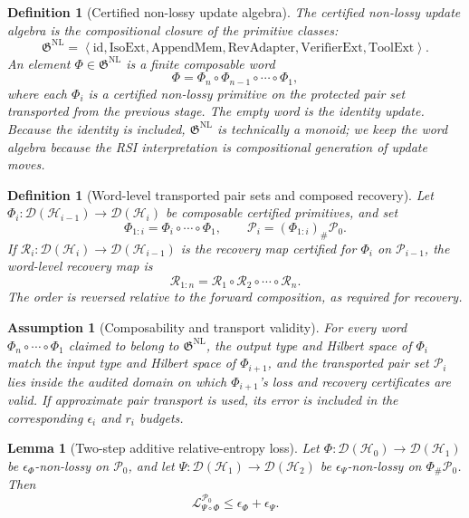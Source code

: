 \documentclass[11pt]{article}
\newtheorem{lemma}[theorem]{Lemma}
\newtheorem{definition}[theorem]{Definition}
\newtheorem{assumption}[theorem]{Assumption}
\newcommand{\D}{\mathcal{D}}
\newcommand{\Hcal}{\mathcal{H}}
\newcommand{\Pcal}{\mathcal{P}}
\newcommand{\Rcal}{\mathcal{R}}
\newcommand{\Lcal}{\mathcal{L}}
\newcommand{\1}{\mathbf{1}}
\begin{document}
\begin{definition}[Certified non-lossy update algebra]
\label{def:certified_nl_update_algebra}
The certified non-lossy update algebra is the compositional closure of the primitive classes:
\[
\boxed{
\mathfrak G^{\mathrm{NL}}
=
\left\langle
\mathrm{id},\mathrm{IsoExt},\mathrm{AppendMem},\mathrm{RevAdapter},\mathrm{VerifierExt},\mathrm{ToolExt}
\right\rangle.
}
\]
An element \(\Phi\in\mathfrak G^{\mathrm{NL}}\) is a finite composable word
\[
\Phi=\Phi_n\circ\Phi_{n-1}\circ\cdots\circ\Phi_1,
\]
where each \(\Phi_i\) is a certified non-lossy primitive on the protected pair set transported from the previous stage.  The empty word is the identity update.  Because the identity is included, \(\mathfrak G^{\mathrm{NL}}\) is technically a monoid; we keep the word algebra because the RSI interpretation is compositional generation of update moves.
\end{definition}

\begin{definition}[Word-level transported pair sets and composed recovery]
\label{def:word_pair_sets_recovery}
Let \(\Phi_i:\D(\Hcal_{i-1})\to\D(\Hcal_i)\) be composable certified primitives, and set
\[
\Phi_{1:i}=\Phi_i\circ\cdots\circ\Phi_1,
\qquad
\Pcal_i=(\Phi_{1:i})_\#\Pcal_0.
\]
If \(\Rcal_i:\D(\Hcal_i)\to\D(\Hcal_{i-1})\) is the recovery map certified for \(\Phi_i\) on \(\Pcal_{i-1}\), the word-level recovery map is
\[
\Rcal_{1:n}=\Rcal_1\circ\Rcal_2\circ\cdots\circ\Rcal_n.
\]
The order is reversed relative to the forward composition, as required for recovery.
\end{definition}

\begin{assumption}[Composability and transport validity]
\label{ass:composability_transport_validity}
For every word \(\Phi_n\circ\cdots\circ\Phi_1\) claimed to belong to \(\mathfrak G^{\mathrm{NL}}\), the output type and Hilbert space of \(\Phi_i\) match the input type and Hilbert space of \(\Phi_{i+1}\), and the transported pair set \(\Pcal_i\) lies inside the audited domain on which \(\Phi_{i+1}\)'s loss and recovery certificates are valid.  If approximate pair transport is used, its error is included in the corresponding \(\epsilon_i\) and \(r_i\) budgets.
\end{assumption}

\begin{lemma}[Two-step additive relative-entropy loss]
\label{lem:two_step_additive_loss}
Let \(\Phi:\D(\Hcal_0)\to\D(\Hcal_1)\) be \(\epsilon_\Phi\)-non-lossy on \(\Pcal_0\), and let \(\Psi:\D(\Hcal_1)\to\D(\Hcal_2)\) be \(\epsilon_\Psi\)-non-lossy on \(\Phi_\#\Pcal_0\).  Then
\[
\Lcal^{\Pcal_0}_{\Psi\circ\Phi}
\le
\epsilon_\Phi+\epsilon_\Psi.
\]
\end{lemma}
\end{document}
